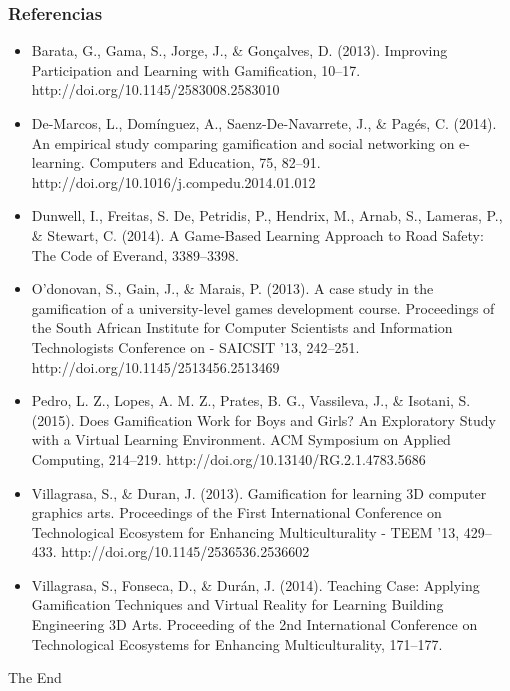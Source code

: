 \documentclass{beamer}
\begin{document}
\begin{frame}
\frametitle{Referencias}
\tiny{
	\begin{itemize}
		\item Barata, G., Gama, S., Jorge, J., \& Gonçalves, D. (2013). Improving Participation and Learning with Gamification, 10–17. http://doi.org/10.1145/2583008.2583010
		\item De-Marcos, L., Domínguez, A., Saenz-De-Navarrete, J., \& Pagés, C. (2014). An empirical study comparing gamification and social networking on e-learning. Computers and Education, 75, 82–91. http://doi.org/10.1016/j.compedu.2014.01.012
		\item Dunwell, I., Freitas, S. De, Petridis, P., Hendrix, M., Arnab, S., Lameras, P., \& Stewart, C. (2014). A Game-Based Learning Approach to Road Safety: The Code of Everand, 3389–3398.
		\item O'donovan, S., Gain, J., \& Marais, P. (2013). A case study in the gamification of a university-level games development course. Proceedings of the South African Institute for Computer Scientists and Information Technologists Conference on - SAICSIT '13, 242–251. http://doi.org/10.1145/2513456.2513469
			\item Pedro, L. Z., Lopes, A. M. Z., Prates, B. G., Vassileva, J., \& Isotani, S. (2015). Does Gamification Work for Boys and Girls? An Exploratory Study with a Virtual Learning Environment. ACM Symposium on Applied Computing, 214–219. http://doi.org/10.13140/RG.2.1.4783.5686
			\item Villagrasa, S., \& Duran, J. (2013). Gamification for learning 3D computer graphics arts. Proceedings of the First International Conference on Technological Ecosystem for Enhancing Multiculturality - TEEM ’13, 429–433. http://doi.org/10.1145/2536536.2536602
			\item Villagrasa, S., Fonseca, D., \& Durán, J. (2014). Teaching Case: Applying Gamification Techniques and Virtual Reality for Learning Building Engineering 3D Arts. Proceeding of the 2nd International Conference on Technological Ecosystems for Enhancing Multiculturality, 171–177.		
	\end{itemize}
}
\end{frame}

\begin{frame}
\Huge{\centerline{The End}}
\end{frame}

\end{document}
